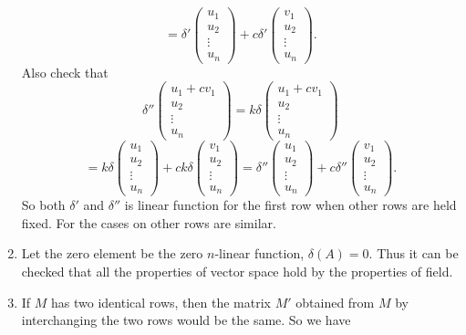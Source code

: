 \begin{enumerate}
\[=\delta'\begin{pmatrix}u_1\\u_2\\\vdots \\u_n\end{pmatrix}+c\delta'\begin{pmatrix}v_1\\u_2\\\vdots \\u_n\end{pmatrix}.\]
Also check that 
\[\delta''\begin{pmatrix}u_1+cv_1\\u_2\\\vdots \\u_n\end{pmatrix}=k\delta\begin{pmatrix}u_1+cv_1\\u_2\\\vdots \\u_n\end{pmatrix}\]
\[=k\delta\begin{pmatrix}u_1\\u_2\\\vdots \\u_n\end{pmatrix}+ck\delta\begin{pmatrix}v_1\\u_2\\\vdots \\u_n\end{pmatrix}=\delta''\begin{pmatrix}u_1\\u_2\\\vdots \\u_n\end{pmatrix}+c\delta''\begin{pmatrix}v_1\\u_2\\\vdots \\u_n\end{pmatrix}.\]
So both $\delta'$ and $\delta''$ is linear function for the first row when other rows are held fixed. For the cases on other rows are similar.
\item Let the zero element be the zero $n$-linear function, $\delta(A)=0$. Thus it can be checked that all the properties of vector space hold by the properties of field.
\item If $M$ has two identical rows, then the matrix $M'$ obtained from $M$ by interchanging the two rows would be the same. So we have 

\end{enumerate}
